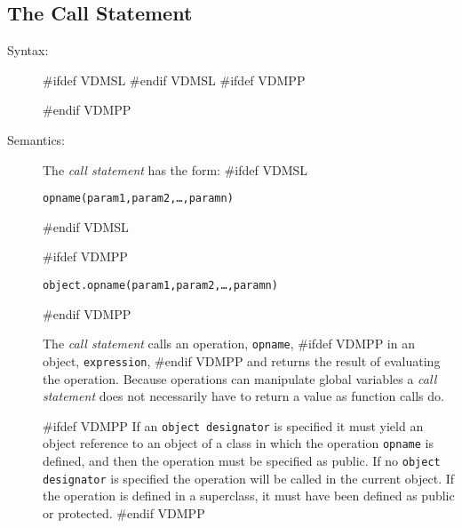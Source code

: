 \documentclass[\pformat,12pt]{article}
\newcommand{\vppsmall}{\small\tt}
\begin{document}
\subsection{The Call Statement}
\label{call-stmt}

\begin{description}
\item[Syntax:]
#ifdef VDMSL
#endif VDMSL
#ifdef VDMPP


#endif VDMPP

\item[Semantics:] The {\it call statement} has the form:
#ifdef VDMSL
  \begin{alltt}
    opname(param1, param2, \ldots, paramn)
  \end{alltt}
#endif VDMSL

#ifdef VDMPP
  \begin{alltt}
    object.opname(param1, param2, \ldots, paramn)
  \end{alltt}
#endif VDMPP

  The {\it call statement} calls an operation, {\tt opname}, %
#ifdef VDMPP in an object, {\tt expression},
#endif VDMPP
and returns the result of
  evaluating the operation. Because operations can manipulate global
  variables a {\it call statement} does not necessarily have to return
  a value as function calls do.

#ifdef VDMPP 
  If an {\vppsmall object designator} is specified it must yield an
  object reference to an object of a class in which the operation
  {\tt opname} is defined, and then the operation must be specified as
  public. If no {\tt object designator} is specified the
  operation will be called in the current object. If the operation is
  defined in a superclass, it must have been defined as public or
  protected. 
#endif VDMPP


\end{description}
\end{document}
